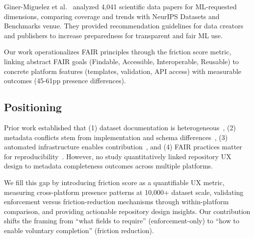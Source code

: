 Giner-Miguelez et al.~\cite{giner2025review} analyzed 4,041 scientific data papers for ML-requested dimensions, comparing coverage and trends with NeurIPS Datasets and Benchmarks venue. They provided recommendation guidelines for data creators and publishers to increase preparedness for transparent and fair ML use.

Our work operationalizes FAIR principles through the friction score metric, linking abstract FAIR goals (Findable, Accessible, Interoperable, Reusable) to concrete platform features (templates, validation, API access) with measurable outcomes (45-61pp presence differences).

\subsection{Positioning}

Prior work established that (1) dataset documentation is heterogeneous~\cite{yang2024dataset}, (2) metadata conflicts stem from implementation and schema differences~\cite{strecker2026metadata}, (3) automated infrastructure enables contribution~\cite{batzner2026shared}, and (4) FAIR practices matter for reproducibility~\cite{samuel2020applying,logan2023review}. However, no study quantitatively linked repository UX design to metadata completeness outcomes across multiple platforms.

We fill this gap by introducing friction score as a quantifiable UX metric, measuring cross-platform presence patterns at 10,000+ dataset scale, validating enforcement versus friction-reduction mechanisms through within-platform comparison, and providing actionable repository design insights. Our contribution shifts the framing from ``what fields to require'' (enforcement-only) to ``how to enable voluntary completion'' (friction reduction).
